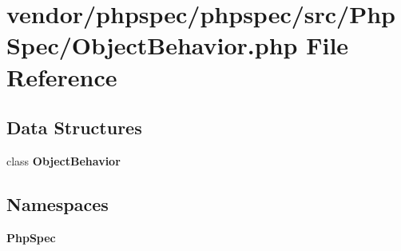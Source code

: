 \section{vendor/phpspec/phpspec/src/\+Php\+Spec/\+Object\+Behavior.php File Reference}
\label{_object_behavior_8php}
\subsection*{Data Structures}
\begin{DoxyCompactItemize}
\item 
class {\bf Object\+Behavior}
\end{DoxyCompactItemize}
\subsection*{Namespaces}
\begin{DoxyCompactItemize}
\item 
 {\bf Php\+Spec}
\end{DoxyCompactItemize}
